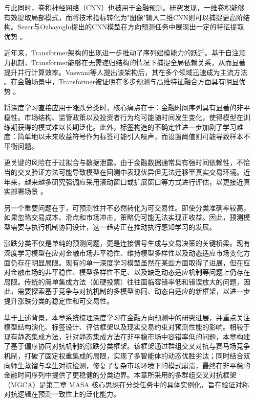 与此同时，卷积神经网络（CNN）也被用于金融预测。研究发现，一维卷积能够有效提取局部模式，而将技术指标转化为"图像"输入二维CNN则可以捕捉更高阶结构。Sezer与Ozbayoglu提出的CNN模型在方向预测任务中展现出一定的特征提取优势 \cite{sezer2018algorithmic}。

近年来，Transformer架构的出现进一步推动了序列建模能力的跃迁。基于自注意力机制，Transformer能够在无需递归结构的情况下捕捉全局依赖关系，从而显著提升并行计算效率。Vaswani等人提出该架构后，其在多个领域迅速成为主流方法 \cite{vaswani2017attention}。在金融场景中，Transformer被证明在多步预测与高维特征融合方面具有明显优势 \cite{zhou2021informer}。

将深度学习直接应用于涨跌分类时，核心痛点在于：金融时间序列具有显著的非平稳性。市场结构、监管政策以及投资者行为均可能随时间发生变化，使得模型在训练期获得的模式难以长期泛化。此外，标签构造的不确定性进一步加剧了学习难度：简单地以未来收益符号作为标签可能引入噪声，而设置阈值则可能导致样本不平衡问题。

更关键的风险在于过拟合与数据泄露。由于金融数据通常具有强时间依赖性，不恰当的交叉验证方法可能导致模型在回测中表现优异但无法迁移至真实交易环境。近年来，越来越多研究强调应采用滚动窗口或扩展窗口等方式进行评估，以更接近真实部署场景 \cite{bailey2015pbo}。

另一个重要问题在于，可预测性并不必然转化为可交易性。即使分类准确率较高，如果忽略交易成本、滑点和市场冲击，策略仍可能无法实现正收益。因此，预测模型需要与执行机制协同设计，这一趋势正在推动执行感知学习的发展。

涨跌分类不仅是单纯的预测问题，更是连接信号生成与交易决策的关键桥梁。现有深度学习模型在应对金融市场非平稳性、维持模型多样性以及动态适应市场变化方面仍存在明显局限。现有的单一深度学习模型虽然在某些方面取得了进展，但在应对金融市场的非平稳性、模型多样性不足、以及缺乏动态适应机制等问题上仍存在局限。传统的简单集成方法（如硬投票）往往面临容错率低和错误放大的问题，因此，需要探索基于竞争与对抗机制的多模型协同、动态自适应的新框架，以进一步提升涨跌分类的稳定性和可交易性。

基于上述背景，本章系统梳理深度学习在金融方向预测中的研究进展，并重点关注模型结构演化、标签设计、评估框架以及现实交易约束对预测性能的影响。相较于现有静态集成方法，针对静态集成方法在非平稳市场中容错率低的问题，本章构建了基于偏序协同对抗机制的涨跌分类框架。该框架通过群组交叉对抗与赛马场竞争机制，打破了固定权重集成的局限，实现了多智能体的动态优胜劣汰；同时结合双向师生蒸馏与孪生对抗检测，修复了复杂市场环境下的模式崩溃，最终在非平稳的金融时间序列中提供了更稳健的分类边界。本章所采用的多群组交叉对抗框架（MGCA）是第二章 MASA 核心思想在分类任务中的具体实例化，旨在验证对称对抗逻辑在预测一致性上的泛化能力。


